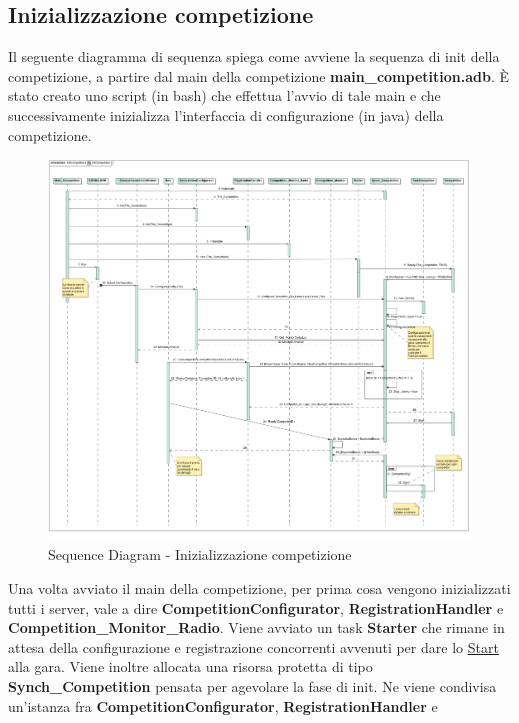 \subsection{Inizializzazione competizione}
Il seguente diagramma di sequenza spiega come avviene la sequenza di init della
competizione, a partire dal main della competizione
\textbf{main\_competition.adb}.
\`{E} stato creato uno script (in bash) che effettua l'avvio di tale
main e che successivamente inizializza 
l'interfaccia di configurazione (in java) della competizione.
\begin{center}
\begin{figure}[h!]
\advance\leftskip-3.2cm
	\includegraphics[angle=90,scale=0.35]{img/SequenceDiagrams/InitCompetition.jpg}
\caption{Sequence Diagram - Inizializzazione competizione}
\end{figure}
\end{center}
\clearpage
Una volta avviato il main della competizione, per prima cosa vengono
inizializzati tutti i server, vale a dire \textbf{CompetitionConfigurator},
\textbf{RegistrationHandler} e \textbf{Competition\_Monitor\_Radio}. Viene
avviato
un task \textbf{Starter} che rimane in attesa
della configurazione e registrazione concorrenti avvenuti per dare lo
\underline{Start} alla gara. Viene inoltre allocata una risorsa protetta di tipo
\textbf{Synch\_Competition} pensata
per agevolare la fase di init. Ne viene condivisa un'istanza fra
\textbf{CompetitionConfigurator}, \textbf{RegistrationHandler} e
